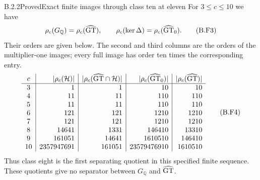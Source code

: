 \begin{result}{B.2.2}{Proved}{Exact finite images through class ten at eleven}
For $3\le c\le10$ we have
\[
 \rho_c(G_{\mathbb Q})=\rho_c(\widehat{\mathrm{GT}}),\qquad
 \rho_c(\ker\Delta)=\rho_c(\widehat{\mathrm{GT}}_0).
                                                               \tag{B.F3}
\]
Their orders are given below. The second and third columns are
the orders of the multiplier-one images; every full image has
order ten times the corresponding entry.
\[
\begin{array}{c|r|r|r|r}
 c&|\rho_c(\mathcal H)|&|\rho_c(\widehat{\mathrm{GT}}\cap\mathcal H)|
   &|\rho_c(\widehat{\mathrm{GT}}_0)|&|\rho_c(\widehat{\mathrm{GT}})|\\\hline
 3&1&1&10&10\\
 4&11&11&110&110\\
 5&11&11&110&110\\
 6&121&121&1210&1210\\
 7&121&121&1210&1210\\
 8&14641&1331&146410&13310\\
 9&161051&14641&1610510&146410\\
 10&2357947691&161051&23579476910&1610510
\end{array}                                                   \tag{B.F4}
\]
Thus class eight is the first separating quotient in this
specified finite sequence. These quotients give no separator
between $G_{\mathbb Q}$ and $\widehat{\mathrm{GT}}$.
\end{result}
